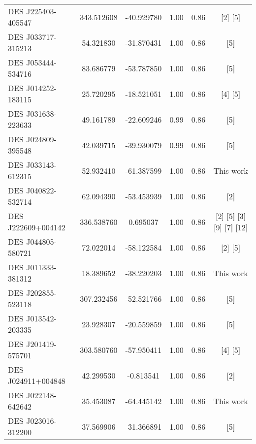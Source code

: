 \documentclass[tradiabstract,twocolumn]{aa}
\begin{document}
{\begin{longtable}{lccccc}
 DES J225403-405547 &  343.512608 & -40.929780 &      1.00 &                    0.86 &                       [2]  [5] \\
 DES J033717-315213 &   54.321830 & -31.870431 &      1.00 &                    0.86 &                            [5] \\
 DES J053444-534716 &   83.686779 & -53.787850 &      1.00 &                    0.86 &                            [5] \\
 DES J014252-183115 &   25.720295 & -18.521051 &      1.00 &                    0.86 &                       [4]  [5] \\
 DES J031638-223633 &   49.161789 & -22.609246 &      0.99 &                    0.86 &                            [5] \\
 DES J024809-395548 &   42.039715 & -39.930079 &      0.99 &                    0.86 &                            [5] \\
 DES J033143-612315 &   52.932410 & -61.387599 &      1.00 &                    0.86 &                      This work \\
 DES J040822-532714 &   62.094390 & -53.453939 &      1.00 &                    0.86 &                            [2] \\
 DES J222609+004142 &  336.538760 &   0.695037 &      1.00 &                    0.86 &  [2]  [5]  [3]  [9]  [7]  [12] \\
 DES J044805-580721 &   72.022014 & -58.122584 &      1.00 &                    0.86 &                       [2]  [5] \\
 DES J011333-381312 &   18.389652 & -38.220203 &      1.00 &                    0.86 &                      This work \\
 DES J202855-523118 &  307.232456 & -52.521766 &      1.00 &                    0.86 &                            [5] \\
 DES J013542-203335 &   23.928307 & -20.559859 &      1.00 &                    0.86 &                            [5] \\
 DES J201419-575701 &  303.580760 & -57.950411 &      1.00 &                    0.86 &                       [4]  [5] \\
 DES J024911+004848 &   42.299530 &  -0.813541 &      1.00 &                    0.86 &                            [2] \\
 DES J022148-642642 &   35.453087 & -64.445142 &      1.00 &                    0.86 &                      This work \\
 DES J023016-312200 &   37.569906 & -31.366891 &      1.00 &                    0.86 &                            [5] \\

\end{longtable}}
\end{document}
